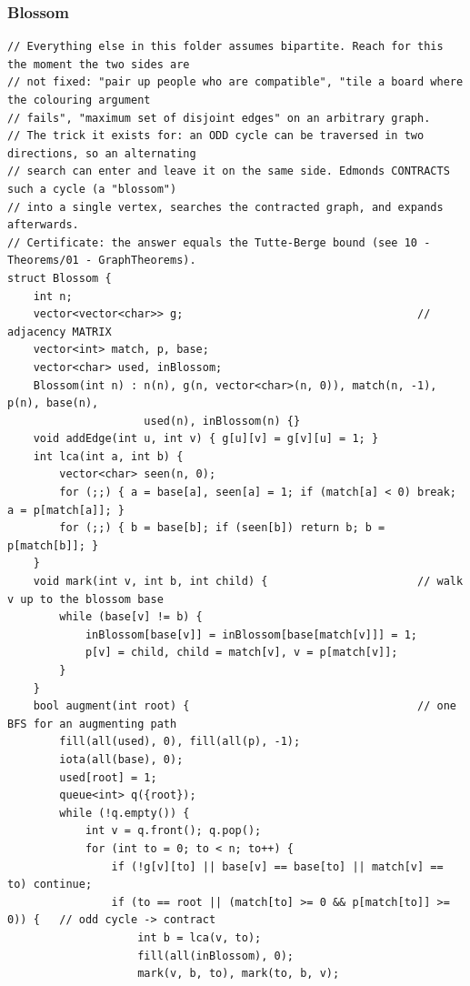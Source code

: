 \documentclass[9pt,a4paper,twocolumn]{extarticle}
\begin{document}
\subsubsection{Blossom}
\nopagebreak
\begin{lstlisting}
// Everything else in this folder assumes bipartite. Reach for this the moment the two sides are
// not fixed: "pair up people who are compatible", "tile a board where the colouring argument
// fails", "maximum set of disjoint edges" on an arbitrary graph.
// The trick it exists for: an ODD cycle can be traversed in two directions, so an alternating
// search can enter and leave it on the same side. Edmonds CONTRACTS such a cycle (a "blossom")
// into a single vertex, searches the contracted graph, and expands afterwards.
// Certificate: the answer equals the Tutte-Berge bound (see 10 - Theorems/01 - GraphTheorems).
struct Blossom {
    int n;
    vector<vector<char>> g;                                    // adjacency MATRIX
    vector<int> match, p, base;
    vector<char> used, inBlossom;
    Blossom(int n) : n(n), g(n, vector<char>(n, 0)), match(n, -1), p(n), base(n),
                     used(n), inBlossom(n) {}
    void addEdge(int u, int v) { g[u][v] = g[v][u] = 1; }
    int lca(int a, int b) {
        vector<char> seen(n, 0);
        for (;;) { a = base[a], seen[a] = 1; if (match[a] < 0) break; a = p[match[a]]; }
        for (;;) { b = base[b]; if (seen[b]) return b; b = p[match[b]]; }
    }
    void mark(int v, int b, int child) {                       // walk v up to the blossom base
        while (base[v] != b) {
            inBlossom[base[v]] = inBlossom[base[match[v]]] = 1;
            p[v] = child, child = match[v], v = p[match[v]];
        }
    }
    bool augment(int root) {                                   // one BFS for an augmenting path
        fill(all(used), 0), fill(all(p), -1);
        iota(all(base), 0);
        used[root] = 1;
        queue<int> q({root});
        while (!q.empty()) {
            int v = q.front(); q.pop();
            for (int to = 0; to < n; to++) {
                if (!g[v][to] || base[v] == base[to] || match[v] == to) continue;
                if (to == root || (match[to] >= 0 && p[match[to]] >= 0)) {   // odd cycle -> contract
                    int b = lca(v, to);
                    fill(all(inBlossom), 0);
                    mark(v, b, to), mark(to, b, v);

\end{lstlisting}
\end{document}
